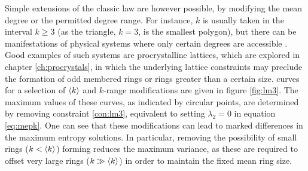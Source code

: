 Simple extensions of the classic law are however possible, by modifying the mean degree or the permitted degree range.
For instance, $k$ is usually taken in the interval $k\geq3$ (as the triangle, $k=3$, is the smallest polygon), but there can be manifestations of physical systems where only certain degrees are accessible \cite{Rivier1988}.
Good examples of such systems are procrystalline lattices, which are explored in chapter \ref{ch:procrystals}, in which the underlying lattice constraints may preclude the formation of odd membered rings or rings greater than a certain size. 
\lm{} curves for a selection of $\langle k \rangle$ and $k$\--range modifications are given in figure \ref{fig:lm3}. 
The maximum values of these curves, as indicated by circular points, are determined by removing constraint \eqref{con:lm3}, equivalent to setting $\lambda_2=0$ in equation \eqref{eq:mepk}.
One can see that these modifications can lead to marked differences in the maximum entropy solutions.
In particular, removing the possibility of small rings ($k<\langle k \rangle$) forming reduces the maximum variance, as these are required to offset very large rings ($k\gg\langle k \rangle$) in order to maintain the fixed mean ring size.


